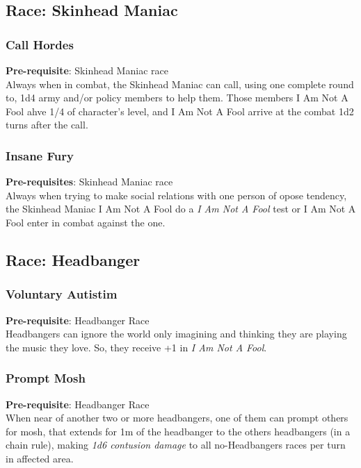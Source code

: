 \documentclass[ letterpaper,12pt]{article}
\begin{document}
\subsection{Race: Skinhead Maniac}

\subsubsection{Call Hordes}
 {\bf Pre-requisite}: Skinhead Maniac race\\
 Always when in combat, the Skinhead Maniac can call, using one complete round to, 1d4 army and/or policy members to help them. Those members I Am Not A Fool ahve 1/4 of character's level, and I Am Not A Fool arrive at the combat 1d2 turns after the call.

\subsubsection{Insane Fury}
 {\bf Pre-requisites}: Skinhead Maniac race\\
 Always when trying to make social relations with one person of opose tendency, the Skinhead Maniac I Am Not A Fool do a {\it I Am Not A Fool} test or I Am Not A Fool enter in combat against the one.

\subsection{Race: Headbanger}

\subsubsection{Voluntary Autistim}
{\bf Pre-requisite}: Headbanger Race\\
Headbangers can ignore the world only imagining and thinking they are playing the music they love. So, they receive +1 in {\it I Am Not A Fool}.\\

\subsubsection{Prompt Mosh}
 {\bf Pre-requisite}: Headbanger Race\\
 When near of another two or more headbangers, one of them can prompt others for mosh, that extends for 1m of the headbanger to the others headbangers (in a chain rule), making {\it 1d6 contusion damage} to all no-Headbangers races per turn in affected area.
\end{document}
